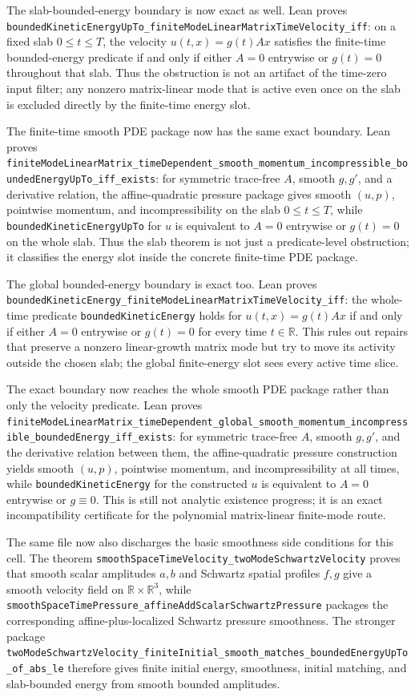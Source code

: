 \documentclass[11pt]{article}
\begin{document}
The slab-bounded-energy boundary is now exact as well.  Lean proves
\texttt{boundedKineticEnergyUpTo\_finiteModeLinearMatrixTimeVelocity\_iff}:
on a fixed slab \(0\le t\le T\), the velocity \(u(t,x)=g(t)Ax\) satisfies the
finite-time bounded-energy predicate if and only if either \(A=0\) entrywise or
\(g(t)=0\) throughout that slab.  Thus the obstruction is not an artifact of
the time-zero input filter; any nonzero matrix-linear mode that is active even
once on the slab is excluded directly by the finite-time energy slot.

The finite-time smooth PDE package now has the same exact boundary.  Lean
proves
\texttt{finiteModeLinearMatrix\_timeDependent\_smooth\_momentum\_incompressible\_boundedEnergyUpTo\_iff\_exists}:
for symmetric trace-free \(A\), smooth \(g,g'\), and a derivative relation, the
affine-quadratic pressure package gives smooth \((u,p)\), pointwise momentum,
and incompressibility on the slab \(0\le t\le T\), while
\texttt{boundedKineticEnergyUpTo} for \(u\) is equivalent to \(A=0\) entrywise
or \(g(t)=0\) on the whole slab.  Thus the slab theorem is not just a
predicate-level obstruction; it classifies the energy slot inside the concrete
finite-time PDE package.

The global bounded-energy boundary is exact too.  Lean proves
\texttt{boundedKineticEnergy\_finiteModeLinearMatrixTimeVelocity\_iff}: the
whole-time predicate \texttt{boundedKineticEnergy} holds for
\(u(t,x)=g(t)Ax\) if and only if either \(A=0\) entrywise or \(g(t)=0\) for
every time \(t\in\mathbb{R}\).  This rules out repairs that preserve a nonzero
linear-growth matrix mode but try to move its activity outside the chosen slab;
the global finite-energy slot sees every active time slice.

The exact boundary now reaches the whole smooth PDE package rather than only
the velocity predicate.  Lean proves
\texttt{finiteModeLinearMatrix\_timeDependent\_global\_smooth\_momentum\_incompressible\_boundedEnergy\_iff\_exists}:
for symmetric trace-free \(A\), smooth \(g,g'\), and the derivative relation
between them, the affine-quadratic pressure construction yields smooth
\((u,p)\), pointwise momentum, and incompressibility at all times, while
\texttt{boundedKineticEnergy} for the constructed \(u\) is equivalent to
\(A=0\) entrywise or \(g\equiv 0\).  This is still not analytic existence
progress; it is an exact incompatibility certificate for the polynomial
matrix-linear finite-mode route.

The same file now also discharges the basic smoothness side conditions for
this cell.  The theorem
\texttt{smoothSpaceTimeVelocity\_twoModeSchwartzVelocity} proves that smooth
scalar amplitudes \(a,b\) and Schwartz spatial profiles \(f,g\) give a
smooth velocity field on \(\mathbb{R}\times\mathbb{R}^3\), while
\texttt{smoothSpaceTimePressure\_affineAddScalarSchwartzPressure} packages the
corresponding affine-plus-localized Schwartz pressure smoothness.  The stronger
package
\texttt{twoModeSchwartzVelocity\_finiteInitial\_smooth\_matches\_boundedEnergyUpTo\_of\_abs\_le}
therefore gives finite initial energy, smoothness, initial matching, and
slab-bounded energy from smooth bounded amplitudes.
\end{document}
